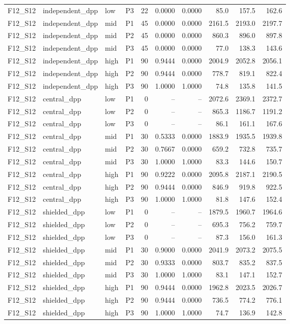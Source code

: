 \begin{longtable}{llllrrrrrr}
F12\_S12 & independent\_dpp & low & P3 & 22 & 0.0000 & 0.0000 & 85.0 & 157.5 & 162.6 \\
F12\_S12 & independent\_dpp & mid & P1 & 45 & 0.0000 & 0.0000 & 2161.5 & 2193.0 & 2197.7 \\
F12\_S12 & independent\_dpp & mid & P2 & 45 & 0.0000 & 0.0000 & 860.3 & 896.0 & 897.8 \\
F12\_S12 & independent\_dpp & mid & P3 & 45 & 0.0000 & 0.0000 & 77.0 & 138.3 & 143.6 \\
F12\_S12 & independent\_dpp & high & P1 & 90 & 0.9444 & 0.0000 & 2004.9 & 2052.8 & 2056.1 \\
F12\_S12 & independent\_dpp & high & P2 & 90 & 0.9444 & 0.0000 & 778.7 & 819.1 & 822.4 \\
F12\_S12 & independent\_dpp & high & P3 & 90 & 1.0000 & 1.0000 & 74.8 & 135.8 & 141.5 \\
F12\_S12 & central\_dpp & low & P1 & 0 & -- & -- & 2072.6 & 2369.1 & 2372.7 \\
F12\_S12 & central\_dpp & low & P2 & 0 & -- & -- & 865.3 & 1186.7 & 1191.2 \\
F12\_S12 & central\_dpp & low & P3 & 0 & -- & -- & 86.1 & 161.1 & 167.6 \\
F12\_S12 & central\_dpp & mid & P1 & 30 & 0.5333 & 0.0000 & 1883.9 & 1935.5 & 1939.8 \\
F12\_S12 & central\_dpp & mid & P2 & 30 & 0.7667 & 0.0000 & 659.2 & 732.8 & 735.7 \\
F12\_S12 & central\_dpp & mid & P3 & 30 & 1.0000 & 1.0000 & 83.3 & 144.6 & 150.7 \\
F12\_S12 & central\_dpp & high & P1 & 90 & 0.9222 & 0.0000 & 2095.8 & 2187.1 & 2190.5 \\
F12\_S12 & central\_dpp & high & P2 & 90 & 0.9444 & 0.0000 & 846.9 & 919.8 & 922.5 \\
F12\_S12 & central\_dpp & high & P3 & 90 & 1.0000 & 1.0000 & 81.8 & 147.6 & 152.4 \\
F12\_S12 & shielded\_dpp & low & P1 & 0 & -- & -- & 1879.5 & 1960.7 & 1964.6 \\
F12\_S12 & shielded\_dpp & low & P2 & 0 & -- & -- & 695.3 & 756.2 & 759.7 \\
F12\_S12 & shielded\_dpp & low & P3 & 0 & -- & -- & 87.3 & 156.0 & 161.3 \\
F12\_S12 & shielded\_dpp & mid & P1 & 30 & 0.9000 & 0.0000 & 2041.9 & 2073.2 & 2075.5 \\
F12\_S12 & shielded\_dpp & mid & P2 & 30 & 0.9333 & 0.0000 & 803.7 & 835.2 & 837.5 \\
F12\_S12 & shielded\_dpp & mid & P3 & 30 & 1.0000 & 1.0000 & 83.1 & 147.1 & 152.7 \\
F12\_S12 & shielded\_dpp & high & P1 & 90 & 0.9444 & 0.0000 & 1962.8 & 2023.5 & 2026.7 \\
F12\_S12 & shielded\_dpp & high & P2 & 90 & 0.9444 & 0.0000 & 736.5 & 774.2 & 776.1 \\
F12\_S12 & shielded\_dpp & high & P3 & 90 & 1.0000 & 1.0000 & 74.7 & 136.9 & 142.8 \\
\bottomrule
\end{longtable}
